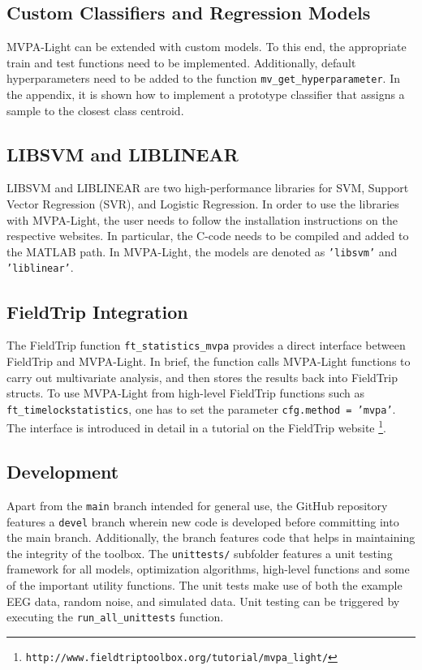 \documentclass[utf8]{frontiersSCNS} %
\newcommand{\ttt}[1]{\texttt{#1}}
\begin{document}
\subsection{Custom Classifiers and Regression Models}

MVPA-Light can be extended with custom models. To this end, the appropriate train and test functions need to be implemented. Additionally, default hyperparameters need to be added to the function \ttt{mv\_get\_hyperparameter}. In the appendix, it is shown how to implement a prototype classifier that assigns a sample to the closest class centroid.

\subsection{LIBSVM and LIBLINEAR}\label{sec:libsvm}

LIBSVM \citep{Chang2011LIBSVM:Machines} and LIBLINEAR \citep{Fan2008} are two high-performance libraries for SVM, Support Vector Regression (SVR), and Logistic Regression. In order to use the libraries with MVPA-Light, the user needs to follow the installation instructions on the respective websites. In particular, the C-code needs to be compiled and added to the MATLAB path. In MVPA-Light, the models are denoted as \ttt{'libsvm'} and \ttt{'liblinear'}.

\subsection{FieldTrip Integration}

The FieldTrip \citep{Oostenveld2011} function \ttt{ft\_statistics\_mvpa} provides a direct interface between FieldTrip and MVPA-Light. In brief, the function calls MVPA-Light functions to carry out multivariate analysis, and then stores the results back into FieldTrip structs. To use MVPA-Light from high-level FieldTrip functions such as \ttt{ft\_timelockstatistics}, one has to set the parameter \ttt{cfg.method = 'mvpa'}. The interface is introduced in detail in a tutorial on the FieldTrip website \footnote{\ttt{http://www.fieldtriptoolbox.org/tutorial/mvpa\_light/}}.

\subsection{Development}\label{sec:development}

Apart from the \ttt{main} branch intended for general use, the GitHub repository features a \ttt{devel} branch wherein new code is developed before committing into the main branch. Additionally, the branch features code that helps in maintaining the integrity of the toolbox. The \ttt{unittests/} subfolder features a unit testing framework for all models, optimization algorithms, high-level functions and some of the important utility functions. The unit tests make use of both the example EEG data, random noise, and simulated data. Unit testing can be triggered by executing the \ttt{run\_all\_unittests} function.
\end{document}
